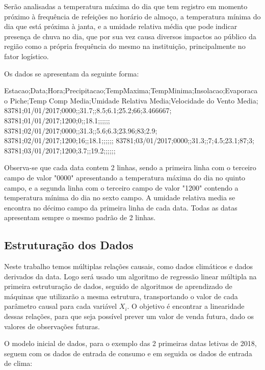 \documentclass[	12pt, Times, openright, twoside, a4paper, english, brazil]{abntex2}
\begin{document}
	Serão analisadas a temperatura máxima do dia que tem registro em momento próximo à frequência de refeições no horário de almoço, a temperatura mínima do dia que está próxima à janta, e a umidade relativa média que pode indicar presença de chuva no dia, que por sua vez causa diversos impactos ao público da região como a própria frequência do mesmo na instituição, principalmente no fator logístico. 
	
	Os dados se apresentam da seguinte forma:\\
	\begin{algorithm}[H]
		Estacao;Data;Hora;Precipitacao;TempMaxima;TempMinima;Insolacao;Evaporacao Piche;Temp Comp Media;Umidade Relativa Media;Velocidade do Vento Media;
		83781;01/01/2017;0000;;31.7;;8.5;6.1;25.2;66;3.466667;
		83781;01/01/2017;1200;0;;18.1;;;;;;
		83781;02/01/2017;0000;;31.3;;5.6;6.3;23.96;83;2.9;
		83781;02/01/2017;1200;16;;18.1;;;;;;
		83781;03/01/2017;0000;;31.3;;7;4.5;23.1;87;3;
		83781;03/01/2017;1200;3.7;;19.2;;;;;;
	\end{algorithm}
	
	Observa-se que cada data contem 2 linhas, sendo a primeira linha com o terceiro campo de valor "0000" apresentando a temperatura máxima do dia no quinto campo, e a segunda linha com o terceiro campo de valor "1200" contendo a temperatura mínima do dia no sexto campo.
	A umidade relativa media se encontra no décimo campo da primeira linha de cada data.
	Todas as datas apresentam sempre o mesmo padrão de 2 linhas.
	
	\subsection{Estruturação dos Dados}
	Neste trabalho temos múltiplas relações causais, como dados climáticos e dados derivados da data. Logo será usado um algoritmo de regressão linear múltipla na primeira estruturação de dados, seguido de algoritmos de aprendizado de máquinas que utilizarão a mesma estrutura, transportando o valor de cada parâmetro causal para cada variável $X_i$.
	O objetivo é encontrar a linearidade dessas relações, para que seja possível prever um valor de venda futura, dado os valores de observações futuras.
	
	O modelo inicial de dados, para o exemplo das 2 primeiras datas letivas de 2018, seguem com os dados de entrada de consumo e em seguida os dados de entrada de clima:\\\\
	
\end{document}
